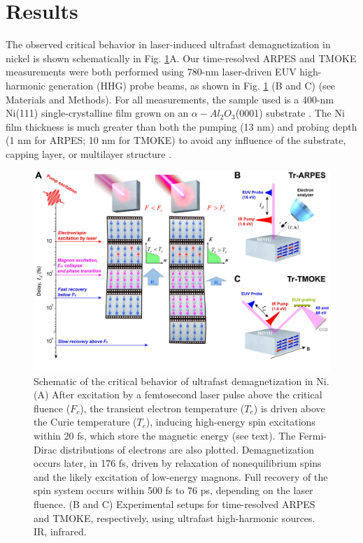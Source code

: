 \section{Results}

The observed critical behavior in laser-induced ultrafast demagnetization in nickel is shown schematically in Fig. \ref{fig: Nifig1}A. Our time-resolved ARPES and TMOKE measurements were both performed using 780-nm laser-driven EUV high-harmonic generation (HHG) probe beams, as shown in Fig. \ref{fig: Nifig1} (B and C) (see Materials and Methods). For all measurements, the sample used is a 400-nm Ni(111) single-crystalline film grown on an $\alpha-Al_{2}O_{3}$(0001) substrate \cite{Miller2012}. The Ni film thickness is much greater than both the pumping (13 nm) and probing depth (1 nm for ARPES; 10 nm for TMOKE) to avoid any influence of the substrate, capping layer, or multilayer structure \cite{Rudolf2012, Dakovski2016,Eschenlohr2013}. 

\begin{figure}[htbp]
	\label{fig: Nifig1}
	\begin{center}
		\includegraphics[width=150mm]{aap9744_Figure_fig1_seq1_v1.pdf}
	\end{center}
	\caption{Schematic of the critical behavior of ultrafast demagnetization in Ni. (A) After excitation by a femtosecond laser pulse above the critical fluence ($F_c$), the transient electron temperature ($T_e$) is driven above the Curie temperature ($T_c$), inducing high-energy spin excitations within 20 fs, which store the magnetic energy (see text). The Fermi-Dirac distributions of electrons are also plotted. Demagnetization occurs later, in 176 fs, driven by relaxation of nonequilibrium spins and the likely excitation of low-energy magnons. Full recovery of the spin system occurs within 500 fs to 76 ps, depending on the laser fluence. (B and C) Experimental setups for time-resolved ARPES and TMOKE, respectively, using ultrafast high-harmonic sources. IR, infrared.}
\end{figure}

